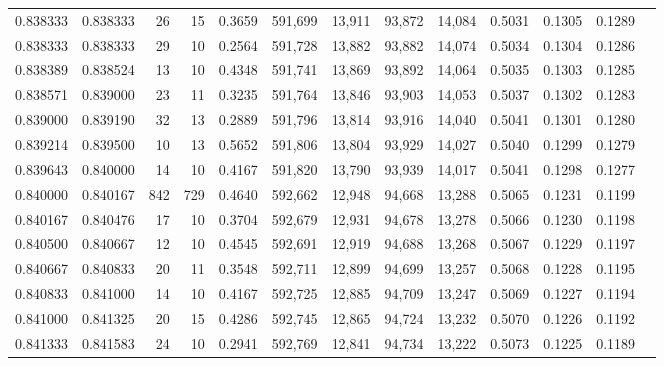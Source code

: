 \begin{tabular}{rrrrrrrrrrrrr}
0.838333 & 0.838333 &    26 &  15 &                                     0.3659 & 591,699 &  13,911 &  93,872 &  14,084 & 0.5031 & 0.1305 & 0.1289 \\
0.838333 & 0.838333 &    29 &  10 &                                     0.2564 & 591,728 &  13,882 &  93,882 &  14,074 & 0.5034 & 0.1304 & 0.1286 \\
0.838389 & 0.838524 &    13 &  10 &                                     0.4348 & 591,741 &  13,869 &  93,892 &  14,064 & 0.5035 & 0.1303 & 0.1285 \\
0.838571 & 0.839000 &    23 &  11 &                                     0.3235 & 591,764 &  13,846 &  93,903 &  14,053 & 0.5037 & 0.1302 & 0.1283 \\
0.839000 & 0.839190 &    32 &  13 &                                     0.2889 & 591,796 &  13,814 &  93,916 &  14,040 & 0.5041 & 0.1301 & 0.1280 \\
0.839214 & 0.839500 &    10 &  13 &                                     0.5652 & 591,806 &  13,804 &  93,929 &  14,027 & 0.5040 & 0.1299 & 0.1279 \\
0.839643 & 0.840000 &    14 &  10 &                                     0.4167 & 591,820 &  13,790 &  93,939 &  14,017 & 0.5041 & 0.1298 & 0.1277 \\
0.840000 & 0.840167 &   842 & 729 &                                     0.4640 & 592,662 &  12,948 &  94,668 &  13,288 & 0.5065 & 0.1231 & 0.1199 \\
0.840167 & 0.840476 &    17 &  10 &                                     0.3704 & 592,679 &  12,931 &  94,678 &  13,278 & 0.5066 & 0.1230 & 0.1198 \\
0.840500 & 0.840667 &    12 &  10 &                                     0.4545 & 592,691 &  12,919 &  94,688 &  13,268 & 0.5067 & 0.1229 & 0.1197 \\
0.840667 & 0.840833 &    20 &  11 &                                     0.3548 & 592,711 &  12,899 &  94,699 &  13,257 & 0.5068 & 0.1228 & 0.1195 \\
0.840833 & 0.841000 &    14 &  10 &                                     0.4167 & 592,725 &  12,885 &  94,709 &  13,247 & 0.5069 & 0.1227 & 0.1194 \\
0.841000 & 0.841325 &    20 &  15 &                                     0.4286 & 592,745 &  12,865 &  94,724 &  13,232 & 0.5070 & 0.1226 & 0.1192 \\
0.841333 & 0.841583 &    24 &  10 &                                     0.2941 & 592,769 &  12,841 &  94,734 &  13,222 & 0.5073 & 0.1225 & 0.1189 \\

\end{tabular}
